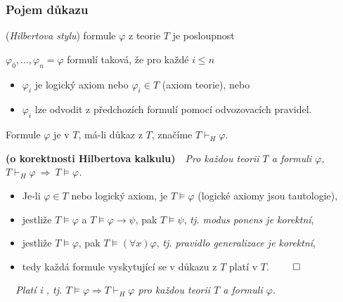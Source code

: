     \subsubsection*{Pojem důkazu}
     (\emph{Hilbertova stylu}) formule $\varphi$ z teorie $T$ je  posloupnost
    \smallskip
    
    $\varphi_0, \dots, \varphi_n=\varphi$ formulí taková, že pro každé $i\le n$
    \smallskip
    
    \begin{itemize}
    \item $\varphi_i$ je logický axiom nebo $\varphi_i \in T$ (axiom teorie), nebo
    \smallskip
    
    \item $\varphi_i$ lze odvodit z předchozích formulí pomocí odvozovacích pravidel.
    \end{itemize}
    \smallskip
    
    Formule $\varphi$ je  v $T$, má-li důkaz z $T$, značíme $T \vdash_{H} \varphi$.
    \bigskip
    
    {\bf {} (o korektnosti Hilbertova kalkulu)}\ \ {\it  Pro každou teorii $T$ a formuli $\varphi$,\ \ $T\vdash_H \varphi\ \Rightarrow\ T\models \varphi$.}
    \medskip
    
    {\it {}}
    \begin{itemize}
    \item Je-li $\varphi\in T$ nebo logický axiom, je $T \models \varphi$ (logické axiomy jsou tautologie),
    \item jestliže $T \models \varphi$ a $T \models \varphi \to \psi$, pak $T \models \psi$, \emph{tj. modus ponens je korektní},
    \item jestliže $T \models \varphi$, pak $T \models (\forall x)\varphi$, \emph{tj. pravidlo generalizace je korektní},
    \item tedy každá formule vyskytující se v důkazu z $T$ platí v $T$. $\qed$
    \end{itemize}
    \medskip
    
    {\it {}\ \ Platí i , tj. $T\models \varphi \Rightarrow T\vdash_H \varphi$ pro každou teorii $T$ a formuli $\varphi$.}
